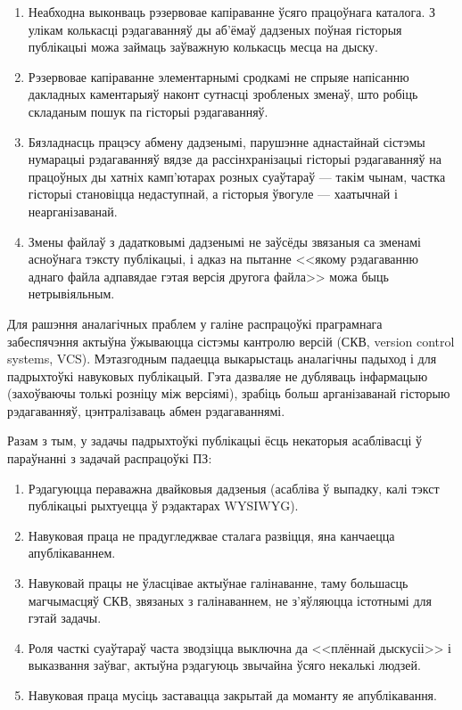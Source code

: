 \documentclass[10pt, a5paper]{article}
\begin{document}
\begin{enumerate}
  \item Неабходна выконваць рэзервовае капіраванне ўсяго працоўнага каталога. З улікам колькасці рэдагаванняў ды аб'ёмаў дадзеных поўная гісторыя публікацыі можа займаць заўважную колькасць месца на дыску.
  \item Рэзервовае капіраванне элементарнымі сродкамі не спрыяе напісанню дакладных каментарыяў наконт сутнасці зробленых зменаў, што робіць складаным пошук па гісторыі рэдагаванняў.
  \item Бязладнасць працэсу абмену дадзенымі, парушэнне аднастайнай сістэмы нумарацыі рэдагаванняў вядзе да рассінхранізацыі гісторыі рэдагаванняў на працоўных ды хатніх камп'ютарах розных суаўтараў --- такім чынам, частка гісторыі становіцца недаступнай, а гісторыя ўвогуле --- хаатычнай і неарганізаванай.
  \item Змены файлаў з дадатковымі дадзенымі не заўсёды звязаныя са зменамі асноўнага тэксту публікацыі, і адказ на пытанне <<якому рэдагаванню аднаго файла адпавядае гэтая версія другога файла>> можа быць нетрывіяльным.
\end{enumerate}

Для рашэння аналагічных праблем у галіне распрацоўкі праграмнага забеспячэння актыўна ўжываюцца сістэмы кантролю версій (СКВ, version control systems, VCS). Мэтазгодным падаецца выкарыстаць аналагічны падыход і для падрыхтоўкі навуковых публікацый. Гэта дазваляе не дубляваць інфармацыю (захоўваючы толькі розніцу між версіямі), зрабіць больш арганізаванай гісторыю рэдагаванняў, цэнтралізаваць абмен рэдагаваннямі.

Разам з тым, у задачы падрыхтоўкі публікацыі ёсць некаторыя асаблівасці ў параўнанні з задачай распрацоўкі ПЗ:

\begin{enumerate}
  \item Рэдагуюцца пераважна двайковыя дадзеныя (асабліва ў выпадку, калі тэкст публікацыі рыхтуецца ў рэдактарах \linebreak WYSIWYG).
  \item Навуковая праца не прадугледжвае сталага развіцця, яна канчаецца апублікаваннем.
  \item Навуковай працы не ўласцівае актыўнае галінаванне, таму большасць магчымасцяў СКВ, звязаных з галінаваннем, не з'яўляюцца істотнымі для гэтай задачы.
  \item Роля часткі суаўтараў часта зводзіцца выключна да <<плённай дыскусіі>> і выказвання заўваг, актыўна рэдагуюць звычайна ўсяго некалькі людзей.
  \item Навуковая праца мусіць заставацца закрытай да моманту яе апублікавання.
\end{enumerate}
\end{document}
